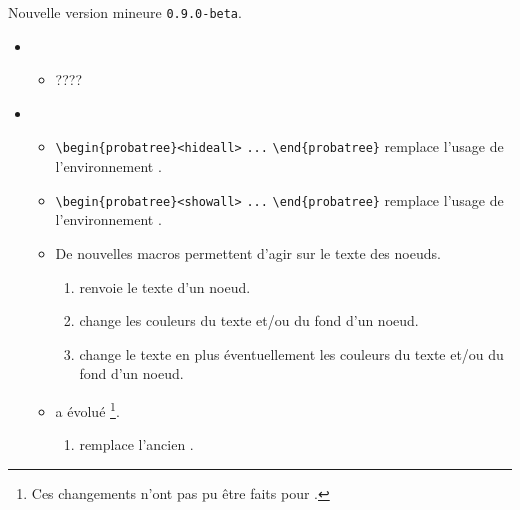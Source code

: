 Nouvelle version mineure \verb+0.9.0-beta+.

\begin{itemize}[itemsep=.5em]
    \item {}
    \begin{itemize}[itemsep=.5em]
    	\item ????
    \end{itemize}




    \item {}
    \begin{itemize}[itemsep=.5em]
        \item \verb#\begin{probatree}<hideall># \verb#...# \verb#\end{probatree}#  remplace l'usage de l'environnement .


        \item \verb#\begin{probatree}<showall># \verb#...# \verb#\end{probatree}# remplace l'usage de l'environnement .


        \item De nouvelles macros permettent d'agir sur le texte des noeuds.

        \begin{enumerate}
        	\item {} renvoie le texte d'un noeud.

        	\item {} change les couleurs du texte et/ou du fond d'un noeud.

        	\item {} change le texte en plus éventuellement  les couleurs du texte et/ou du fond d'un noeud.
        \end{enumerate}


        \item {} a évolué
              \footnote{
              		Ces changements n'ont pas pu être faits pour .
			  }.

        \begin{enumerate}
        	\item {} remplace l'ancien .


\end{enumerate}
\end{itemize}
\end{itemize}
